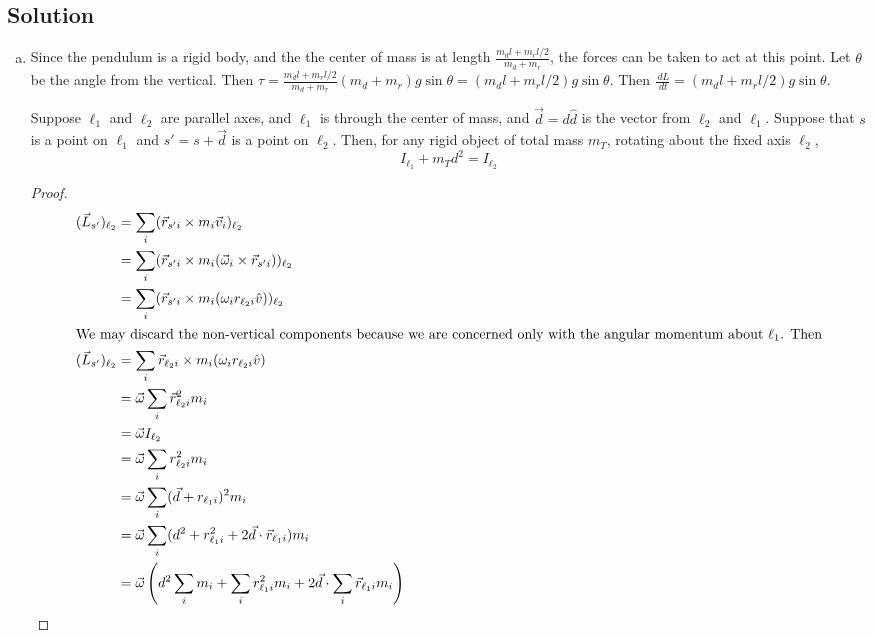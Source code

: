 \documentclass[solutions]{esg8012pset}
\renewcommand{\d}{\,d}
\begin{document}
\subsection*{Solution}
  \begin{enumerate}[(a)]
    \item Since the pendulum is a rigid body, and the the center of mass is at length $\frac{m_d l + m_r l / 2}{m_d + m_r}$, the forces can be taken to act at this point.  Let $\theta$ be the angle from the vertical.  Then $\tau = \frac{m_d l + m_r l / 2}{m_d + m_r} (m_d + m_r)g\sin\theta = (m_d l + m_r l / 2)g\sin\theta$.  Then $\frac{\d L}{\d t} = (m_d l + m_r l / 2)g\sin\theta$.
    \begin{thm}
    Suppose $\ell_1$ and $\ell_2$ are parallel axes, and $\ell_1$ is through the center of mass, and $\vec d = d\hat d$ is the vector from $\ell_2$ and $\ell_1$.  Suppose that $s$ is a point on $\ell_1$ and $s' = s + \vec d$ is a point on $\ell_2$.  Then, for any rigid object of total mass $m_T$, rotating about the fixed axis $\ell_2$, \begin{equation} I_{\ell_1} + m_T d^2 = I_{\ell_2} \end{equation}
    \end{thm}
    \begin{proof}
      \begin{align*}
        (\vec L_{s'})_{\ell_2} & = \sum_i (\vec r_{s'i} \times m_i\vec v_i)_{\ell_2} \\
        & = \sum_i (\vec r_{s'i} \times m_i(\vec \omega_i \times \vec r_{s'i}))_{\ell_2} \\
        & = \sum_i (\vec r_{s'i} \times m_i(\omega_i r_{\ell_2 i} \hat v))_{\ell_2} \\
  \intertext{We may discard the non-vertical components because we are concerned only with the angular momentum about $\ell_1$.  Then}
        (\vec L_{s'})_{\ell_2} & = \sum_i \vec r_{\ell_2 i} \times m_i(\omega_i r_{\ell_2 i} \hat v) \\
        & = \vec \omega \sum_i \vec r_{\ell_2 i}^2 m_i \\
        & = \vec \omega I_{\ell_2} \\
        & = \vec \omega \sum_i r_{\ell_2 i}^2 m_i \\
        & = \vec \omega \sum_i (\vec d + r_{\ell_1 i})^2 m_i \\
        & = \vec \omega \sum_i (d^2 + r_{\ell_1 i}^2 + 2\vec d \cdot \vec r_{\ell_1 i}) m_i \\
        & = \vec \omega \left( d^2 \sum_i m_i +  \sum_i r_{\ell_1 i}^2 m_i + 2\vec d \cdot \sum_i \vec r_{\ell_1 i} m_i \right) \\

\end{align*}
\end{proof}
\end{enumerate}
\end{document}

